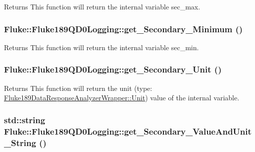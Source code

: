 \label{classFluke_1_1Fluke189QD0Logging_a368a2503ede00bd9ef45937fc76278ea}
\begin{DoxyReturn}{Returns}
This function will return the internal variable sec\_\-max. 
\end{DoxyReturn}
\hypertarget{classFluke_1_1Fluke189QD0Logging_a447e04b2f508cb4a821c2842b96115ae}{
\subsubsection[{get\_\-Secondary\_\-Minimum}]{ Fluke::Fluke189QD0Logging::get\_\-Secondary\_\-Minimum ()}}
\label{classFluke_1_1Fluke189QD0Logging_a447e04b2f508cb4a821c2842b96115ae}
\begin{DoxyReturn}{Returns}
This function will return the internal variable sec\_\-min. 
\end{DoxyReturn}
\hypertarget{classFluke_1_1Fluke189QD0Logging_a7d50361ed373ebaf4bf9cd7bf101f93d}{
\subsubsection[{get\_\-Secondary\_\-Unit}]{ Fluke::Fluke189QD0Logging::get\_\-Secondary\_\-Unit ()}}
\label{classFluke_1_1Fluke189QD0Logging_a7d50361ed373ebaf4bf9cd7bf101f93d}
\begin{DoxyReturn}{Returns}
This function will return the unit (type: \hyperlink{classFluke_1_1Fluke189DataResponseAnalyzerWrapper_ab8e5f2306e4d2ad3d741d273793aaed1}{Fluke189DataResponseAnalyzerWrapper::Unit}) value of the internal variable. 
\end{DoxyReturn}
\hypertarget{classFluke_1_1Fluke189QD0Logging_a5e36bbcb7bc5c45ffaf099af76c46d7e}{
\subsubsection[{get\_\-Secondary\_\-ValueAndUnit\_\-String}]{\setlength{\rightskip}{0pt plus 5cm}std::string Fluke::Fluke189QD0Logging::get\_\-Secondary\_\-ValueAndUnit\_\-String ()}}

